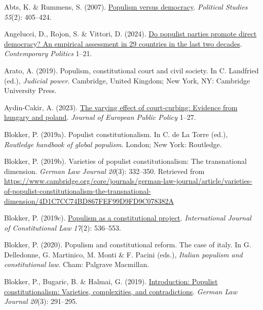 \documentclass[
  abstract]{article}
\newlength{\cslhangindent}
\newlength{\cslentryspacingunit} %
\newenvironment{CSLReferences}[2] %
 {%
  \setlength{\parindent}{0pt}
  \ifodd #1
  \let\oldpar\par
  \def\par{\hangindent=\cslhangindent\oldpar}
  \fi
  \setlength{\parskip}{#2\cslentryspacingunit}
 }%
 {}
\begin{document}
\hypertarget{refs}{}
\begin{CSLReferences}{1}{0}
\leavevmode{}%
Abts, K. \& Rummens, S. (2007).
\href{https://doi.org/10.1111/j.1467-9248.2007.00657.x}{Populism versus
democracy}. \emph{Political Studies} \emph{55}(2): 405--424.

\leavevmode{}%
Angelucci, D., Rojon, S. \& Vittori, D. (2024).
\href{https://doi.org/10.1080/13569775.2023.2296748}{Do populist parties
promote direct democracy? An empirical assessment in 29 countries in the
last two decades}. \emph{Contemporary Politics} 1--21.

\leavevmode{}%
Arato, A. (2019). Populism, constitutional court and civil society. In
C. Landfried (ed.), \emph{Judicial power}. Cambridge, United Kingdom;
New York, NY: {Cambridge University Press}.

\leavevmode{}%
Aydin-Cakir, A. (2023).
\href{https://doi.org/10.1080/13501763.2023.2171089}{The varying effect
of court-curbing: Evidence from hungary and poland}. \emph{Journal of
European Public Policy} 1--27.

\leavevmode{}%
Blokker, P. (2019a). Populist constitutionalism. In C. de La Torre
(ed.), \emph{Routledge handbook of global populism}. London; New York:
Routledge.

\leavevmode{}%
Blokker, P. (2019b). Varieties of populist constitutionalism: The
transnational dimension. \emph{German Law Journal} \emph{20}(3):
332--350. Retrieved from
\url{https://www.cambridge.org/core/journals/german-law-journal/article/varieties-of-populist-constitutionalism-the-transnational-dimension/4D1C7CC74BD867FEF99D9FD9C078382A}

\leavevmode{}%
Blokker, P. (2019c). \href{https://doi.org/10.1093/icon/moz028}{Populism
as a constitutional project}. \emph{International Journal of
Constitutional Law} \emph{17}(2): 536--553.

\leavevmode{}%
Blokker, P. (2020). Populism and constitutional reform. The case of
italy. In G. Delledonne, G. Martinico, M. Monti \& F. Pacini (eds.),
\emph{Italian populism and constitutional law}. Cham: {Palgrave
Macmillan}.

\leavevmode{}%
Blokker, P., Bugaric, B. \& Halmai, G. (2019).
\href{https://doi.org/10.1017/glj.2019.24}{Introduction: Populist
constitutionalism: Varieties, complexities, and contradictions}.
\emph{German Law Journal} \emph{20}(3): 291--295.


\end{CSLReferences}
\end{document}
